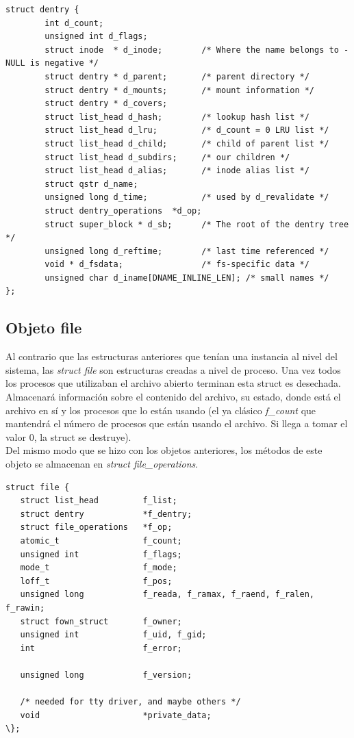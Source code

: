 \documentclass[11pt,a4paper]{article}
\newcommand\tab[1][1cm]{\hspace*{#1}}
\begin{document}
\begin{verbatim}
struct dentry {
        int d_count;
        unsigned int d_flags; 
        struct inode  * d_inode;        /* Where the name belongs to - NULL is negative */
        struct dentry * d_parent;       /* parent directory */
        struct dentry * d_mounts;       /* mount information */
        struct dentry * d_covers;
        struct list_head d_hash;        /* lookup hash list */
        struct list_head d_lru;         /* d_count = 0 LRU list */
        struct list_head d_child;       /* child of parent list */
        struct list_head d_subdirs;     /* our children */
        struct list_head d_alias;       /* inode alias list */
        struct qstr d_name;
        unsigned long d_time;           /* used by d_revalidate */
        struct dentry_operations  *d_op;
        struct super_block * d_sb;      /* The root of the dentry tree */
        unsigned long d_reftime;        /* last time referenced */
        void * d_fsdata;                /* fs-specific data */
        unsigned char d_iname[DNAME_INLINE_LEN]; /* small names */
};
\end{verbatim}

\subsection{Objeto file}

\tab Al contrario que las estructuras anteriores que tenían una instancia al nivel del sistema, las \emph{struct file} son estructuras creadas a nivel de proceso. Una vez todos los procesos que utilizaban el archivo abierto terminan esta struct es desechada. Almacenará información sobre el contenido del archivo, su estado, donde está el archivo en sí y los procesos que lo están usando (el ya clásico \emph{f\_count} que mantendrá el número de procesos que están usando el archivo. Si llega a tomar el valor 0, la struct se destruye). \cite{diapo} \\

\tab Del mismo modo que se hizo con los objetos anteriores, los métodos de este objeto se almacenan en \emph{struct file\_operations}. \\

\begin{verbatim}
struct file {
   struct list_head         f_list;
   struct dentry            *f_dentry;
   struct file_operations   *f_op;
   atomic_t                 f_count;
   unsigned int             f_flags;
   mode_t                   f_mode;
   loff_t                   f_pos;
   unsigned long            f_reada, f_ramax, f_raend, f_ralen, f_rawin;
   struct fown_struct       f_owner;
   unsigned int             f_uid, f_gid;
   int                      f_error;

   unsigned long            f_version;

   /* needed for tty driver, and maybe others */
   void                     *private_data;
\};
\end{verbatim}
\end{document}
